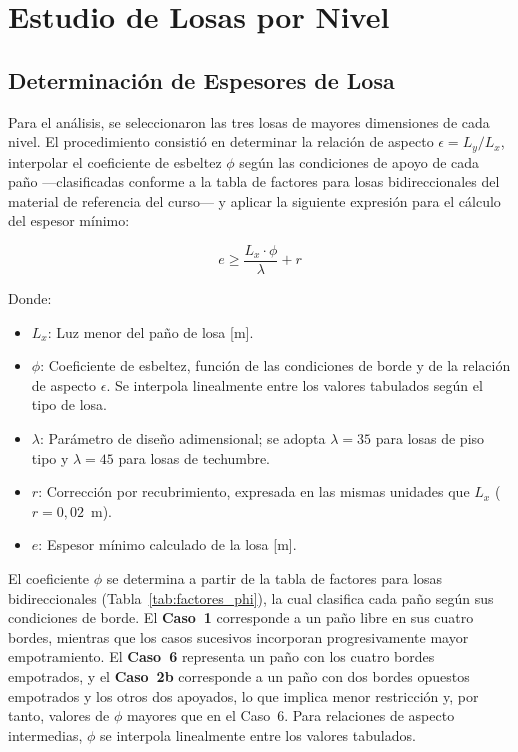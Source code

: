 \section{Estudio de Losas por Nivel}

\subsection{Determinación de Espesores de Losa}

Para el análisis, se seleccionaron las tres losas de mayores dimensiones de cada 
nivel. El procedimiento consistió en determinar la relación de aspecto $\epsilon = 
L_y/L_x$, interpolar el coeficiente de esbeltez $\phi$ según las condiciones de 
apoyo de cada paño —clasificadas conforme a la tabla de factores para losas 
bidireccionales del material de referencia del curso— y aplicar la siguiente 
expresión para el cálculo del espesor mínimo:

\begin{equation}
    e \geq \frac{L_x \cdot \phi}{\lambda}+ r
    \label{eq:espesor_losa}
\end{equation}

Donde:
\begin{itemize}
    \item $L_x$: Luz menor del paño de losa [m].
    \item $\phi$: Coeficiente de esbeltez, función de las condiciones de borde 
    y de la relación de aspecto $\epsilon$. Se interpola linealmente entre los 
    valores tabulados según el tipo de losa.
    \item $\lambda$: Parámetro de diseño adimensional; se adopta $\lambda = 35$ 
    para losas de piso tipo y $\lambda = 45$ para losas de techumbre.
    \item $r$: Corrección por recubrimiento, expresada en las mismas unidades 
    que $L_x$ ($r = 0{,}02$~m).
    \item $e$: Espesor mínimo calculado de la losa [m].
\end{itemize}

El coeficiente $\phi$ se determina a partir de la tabla de factores para losas 
bidireccionales (Tabla~\ref{tab:factores_phi}), la cual clasifica cada paño según 
sus condiciones de borde. El \textbf{Caso~1} corresponde a un paño libre en sus 
cuatro bordes, mientras que los casos sucesivos incorporan progresivamente mayor 
empotramiento. El \textbf{Caso~6} representa un paño con los cuatro bordes 
empotrados, y el \textbf{Caso~2b} corresponde a un paño con dos bordes opuestos 
empotrados y los otros dos apoyados, lo que implica menor restricción y, por 
tanto, valores de $\phi$ mayores que en el Caso~6. Para relaciones de aspecto 
intermedias, $\phi$ se interpola linealmente entre los valores tabulados.

